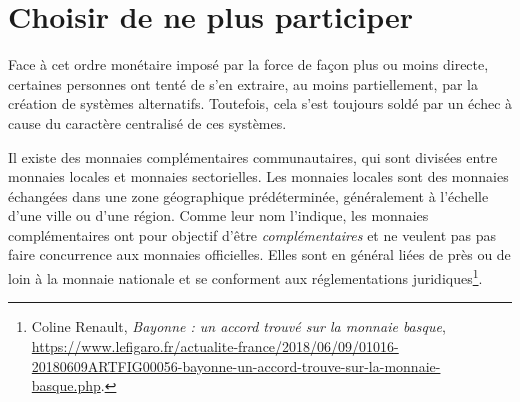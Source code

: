 
\section{Choisir de ne plus participer} %

Face à cet ordre monétaire imposé par la force de façon plus ou moins directe, certaines personnes ont tenté de s'en extraire, au moins partiellement, par la création de systèmes alternatifs. Toutefois, cela s'est toujours soldé par un échec à cause du caractère centralisé de ces systèmes.




Il existe des monnaies complémentaires communautaires, qui sont divisées entre monnaies locales et monnaies sectorielles. Les monnaies locales sont des monnaies échangées dans une zone géographique prédéterminée, généralement à l'échelle d'une ville ou d'une région. Comme leur nom l'indique, les monnaies complémentaires ont pour objectif d'être \emph{complémentaires} et ne veulent pas pas faire concurrence aux monnaies officielles. Elles sont en général liées de près ou de loin à la monnaie nationale et se conforment aux réglementations juridiques\footnote{Coline Renault, \emph{Bayonne : un accord trouvé sur la monnaie basque}, \url{https://www.lefigaro.fr/actualite-france/2018/06/09/01016-20180609ARTFIG00056-bayonne-un-accord-trouve-sur-la-monnaie-basque.php}.}.

